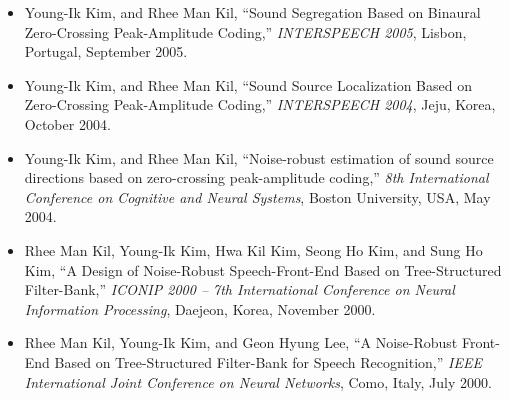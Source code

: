 \documentclass[11pt,a4paper]{article}
\begin{document}
\begin{itemize}[leftmargin=*]
\item Young-Ik Kim, and Rhee Man Kil, ``Sound Segregation Based on Binaural Zero-Crossing Peak-Amplitude Coding,'' \textit{INTERSPEECH 2005}, Lisbon, Portugal, September 2005. 
\item Young-Ik Kim, and Rhee Man Kil, ``Sound Source Localization Based on Zero-Crossing Peak-Amplitude Coding,'' \textit{INTERSPEECH 2004}, Jeju, Korea, October 2004.
\item Young-Ik Kim, and Rhee Man Kil, ``Noise-robust estimation of sound source directions based on zero-crossing peak-amplitude coding,'' \textit{8th International Conference on Cognitive and Neural Systems}, Boston University, USA, May 2004. 
\item Rhee Man Kil, Young-Ik Kim, Hwa Kil Kim, Seong Ho Kim, and Sung Ho Kim, ``A Design of Noise-Robust Speech-Front-End Based on Tree-Structured Filter-Bank,'' \textit{ICONIP 2000 -- 7th International Conference on Neural Information Processing}, Daejeon, Korea, November 2000. 
\item Rhee Man Kil, Young-Ik Kim, and Geon Hyung Lee, ``A Noise-Robust Front-End Based on Tree-Structured Filter-Bank for Speech Recognition,'' \textit{IEEE International Joint Conference on Neural Networks}, Como, Italy, July 2000. 
\end{itemize}
\end{document}
